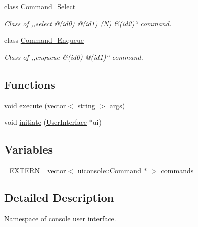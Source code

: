 \begin{DoxyCompactItemize}
class \hyperlink{classuiconsole_1_1Command__Select}{Command\_\-Select}
\begin{DoxyCompactList}\small\item\em Class of ,,select @(id0) @(id1) (N) \&(id2)`` command. \item\end{DoxyCompactList}\item 
class \hyperlink{classuiconsole_1_1Command__Enqueue}{Command\_\-Enqueue}
\begin{DoxyCompactList}\small\item\em Class of ,,enqueue \&(id0) @(id1)`` command. \item\end{DoxyCompactList}\end{DoxyCompactItemize}
\subsection*{Functions}
\begin{DoxyCompactItemize}
\item 
void \hyperlink{namespaceuiconsole_a40263e63a42257769b2fb9a95fd771c1}{execute} (vector$<$ string $>$ args)
\item 
void \hyperlink{namespaceuiconsole_a037fc32900a055adc36892666b385f30}{initiate} (\hyperlink{classUserInterface}{UserInterface} $\ast$ui)
\end{DoxyCompactItemize}
\subsection*{Variables}
\begin{DoxyCompactItemize}
\item 
\_\-EXTERN\_\- vector$<$ \hyperlink{classuiconsole_1_1Command}{uiconsole::Command} $\ast$ $>$ \hyperlink{namespaceuiconsole_a2592267a0e2c7bd8742a231b656153d2}{commands}
\end{DoxyCompactItemize}


\subsection{Detailed Description}
Namespace of console user interface. 

